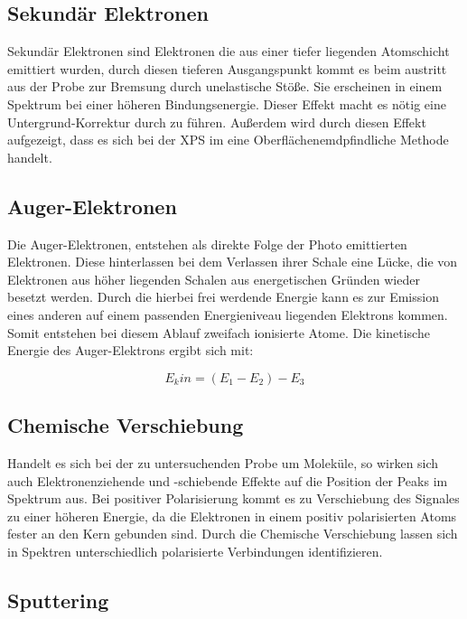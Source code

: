 \documentclass{article}
\begin{document}
\subsection{Sekundär Elektronen}

Sekundär Elektronen sind Elektronen die aus einer tiefer liegenden Atomschicht emittiert wurden, durch diesen tieferen Ausgangspunkt kommt es beim austritt aus der Probe zur Bremsung durch unelastische Stöße. Sie erscheinen in einem Spektrum bei einer höheren Bindungsenergie. Dieser Effekt macht es nötig eine Untergrund-Korrektur durch zu führen. Außerdem wird durch diesen Effekt aufgezeigt, dass es sich bei der XPS im eine Oberflächenemdpfindliche Methode handelt. 

\subsection{Auger-Elektronen}

Die Auger-Elektronen, entstehen als direkte Folge der Photo emittierten Elektronen. Diese hinterlassen bei dem Verlassen ihrer Schale eine Lücke, die von Elektronen aus höher liegenden Schalen aus energetischen Gründen wieder besetzt werden. Durch die hierbei frei werdende Energie kann es zur Emission eines anderen auf einem passenden Energieniveau liegenden Elektrons kommen. Somit entstehen bei diesem Ablauf zweifach ionisierte Atome. Die kinetische Energie des Auger-Elektrons ergibt sich mit:

\begin{equation}
    E{_kin} = (E_1-E_2)-E_3
\end{equation}

\subsection{Chemische Verschiebung}

Handelt es sich bei der zu untersuchenden Probe um Moleküle, so wirken sich auch Elektronenziehende und -schiebende Effekte auf die Position der Peaks im Spektrum aus. Bei positiver Polarisierung kommt es zu Verschiebung des Signales zu einer höheren Energie, da die Elektronen in einem positiv polarisierten Atoms fester an den Kern gebunden sind. Durch die Chemische Verschiebung lassen sich in Spektren unterschiedlich polarisierte Verbindungen identifizieren.

\subsection{Sputtering}
\end{document}
